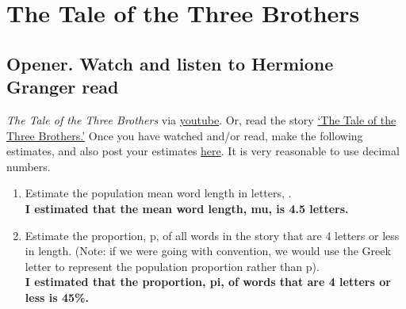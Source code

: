 \documentclass[letterpaper]{article}
\def\tightlist{}
\newcommand{\titleDOC}{}
\newcommand{\authorDOC}{Daniel Sabalakov}
\newcommand{\classDOC}{}
\begin{document}








\renewcommand{\titleDOC}{Tale of Three Brothers}

\renewcommand{\classDOC}{DE Intro to Statistics I}

\renewcommand{\authorDOC}{Daniel Sabalakov}



\section{The Tale of the Three Brothers}\label{the-tale-of-the-three-brothers}

\subsection{Opener. Watch and listen to Hermione Granger read}\label{opener.-watch-and-listen-to-hermione-granger-read}

\emph{The Tale of the Three Brothers} via \href{https://www.youtube.com/watch?v=3-cCDtwsX-g}{youtube}. Or, read the story \href{https://docs.google.com/document/d/1Ugxtj6TQ6_RpczYdlX9hmL2FLVhYkFpePDHELIJYlKw/edit}{`The Tale of the Three Brothers.'} Once you have watched and/or read, make the following estimates, and also post your estimates \href{https://docs.google.com/spreadsheets/d/1owOXUpW_RaPWvUAPDeZWGf9HGYYc9L2ZZCbDVBNRecg/edit?gid=0\#gid=0}{here}. It is very reasonable to use decimal numbers.

\begin{enumerate}
\def\labelenumi{\alph{enumi}.}
\tightlist
\item
  Estimate the population mean word length in letters, .\\
  \textbf{I estimated that the mean word length, mu, is 4.5 letters.}\\
\item
  Estimate the proportion, p, of all words in the story that are 4 letters or less in length. (Note: if we were going with convention, we would use the Greek letter to represent the population proportion rather than p).\\
  \textbf{I estimated that the proportion, pi, of words that are 4 letters or less is 45\%.}
\end{enumerate}
\end{document}
